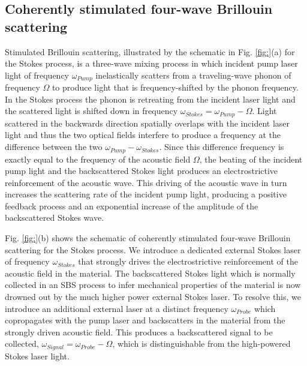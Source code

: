 \documentclass[%
  reprint,
  superscriptaddress,
  amsmath,amssymb,
  aps,
  prapplied,
]{revtex4-2}
\begin{document}
\subsection*{Coherently stimulated four-wave Brillouin scattering}\label{Theoretical Framework:Coherently stimulated five-wave Brillouin scattering}
Stimulated Brillouin scattering, illustrated by the schematic in Fig. \ref{fig:}(a) for the Stokes process, is a three-wave mixing process in which incident pump laser light of frequency $\omega_{Pump}$ inelastically scatters from a traveling-wave phonon of frequency $\Omega$ to produce light that is frequency-shifted by the phonon frequency. In the Stokes process the phonon is retreating from the incident laser light and the scattered light is shifted down in frequency $\omega_{Stokes} = \omega_{Pump} - \Omega$. Light scattered in the backwards direction spatially overlaps with the incident laser light and thus the two optical fields interfere to produce a frequency at the difference between the two $\omega_{Pump} - \omega_{Stokes}$. Since this difference frequency is exactly equal to the frequency of the acoustic field $\Omega$, the beating of the incident pump light and the backscattered Stokes light produces an electrostrictive reinforcement of the acoustic wave. This driving of the acoustic wave in turn increases the scattering rate of the incident pump light, producing a positive feedback process and an exponential increase of the amplitude of the backscattered Stokes wave.

Fig. \ref{fig:}(b) shows the schematic of coherently stimulated four-wave Brillouin scattering for the Stokes process. We introduce a dedicated external Stokes laser of frequency $\omega_{Stokes}$ that strongly drives the electrostrictive reinforcement of the acoustic field in the material. The backscattered Stokes light which is normally collected in an SBS process to infer mechanical properties of the material is now drowned out by the much higher power external Stokes laser. To resolve this, we introduce an additional external laser at a distinct frequency $\omega_{Probe}$ which copropagates with the pump laser and backscatters in the material from the strongly driven acoustic field. This produces a backscattered signal to be collected, $\omega_{Signal} = \omega_{Probe} - \Omega$, which is distinguishable from the high-powered Stokes laser light.
\end{document}
